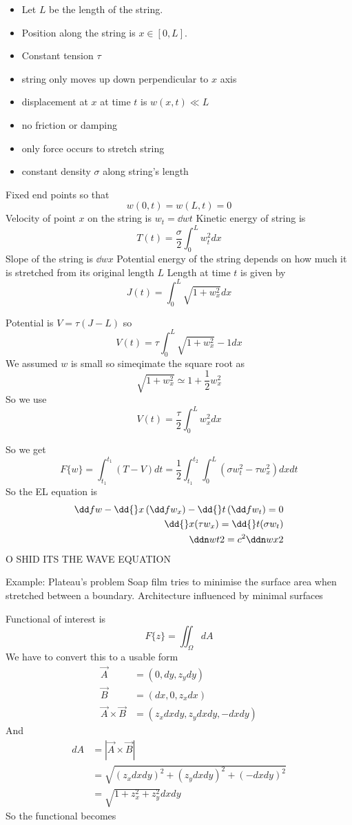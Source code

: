 \documentclass{E:/Documents/Latex/myassignment}
\begin{document}
\begin{itemize}
	\item Let $L$ be the length of the string.
	\item Position along the string is $x \in [0,L]$.
	\item Constant tension $\tau$
	\item string only moves up down perpendicular to $x$ axis
	\item displacement at $x$ at time $t$ is $w(x,t) \ll L$
	\item no friction or damping
	\item only force occurs to stretch string
	\item constant density $\sigma$ along string's length
\end{itemize}

Fixed end points so that
\[w(0,t) = w(L,t) = 0\]
Velocity of point $x$ on the string is $w_t = \dd wt$
Kinetic energy of string is
\[T(t) = \frac \sigma 2 \int_0^L w_t^2 dx\]
Slope of the string is $\dd wx$
Potential energy of the string depends on how much it is stretched from its original length $L$
Length at time $t$ is given by
\[J(t) = \int_0^L \sqrt{1 + w_x^2} dx\]

Potential is $V = \tau(J-L)$ so
\[V(t) = \tau \int_0^L \sqrt{1 + w_x^2} - 1 dx\]
We assumed $w$ is small so simeqimate the square root as
\[\sqrt{1+w_x^2} \simeq 1 + \frac12 w_x^2\]
So we use
\[V(t) = \frac{\tau}{2} \int_0^L w_x^2 dx\]


So we get
\[F\{w\} = \int_{t_1}^{t_1} \left(T-V\right) dt = \frac12 \int_{t_1}^{t_2} \int_0^L \left(\sigma w_t^2 - \tau w_x^2\right) dx dt\]
So the EL equation is
\begin{align*}
	\dd fw - \dd{}x\left(\dd f{w_x}\right) - \dd{}t \left(\dd f{w_t}\right) = 0\\
	\dd{}x (\tau w_x) = \dd{}t (\sigma w_t)\\
	\ddn wt2 = c^2 \ddn wx2
\end{align*}
O SHID ITS THE WAVE EQUATION






Example: Plateau's problem
Soap film tries to minimise the surface area when stretched between a boundary.
Architecture influenced by minimal surfaces

Functional of interest is
\[F\{z\} = \iint_{\Omega} dA\]
We have to convert this to a usable form
\begin{align*}
	\vec A &= (0,dy,z_ydy)\\
	\vec B &= (dx,0,z_x dx)\\
	\vec A\times \vec B &= (z_x dxdy, z_y dxdy, -dxdy)
\end{align*}
And
\begin{align*}
	dA &= |\vec A\times \vec B| \\
	&=	\sqrt{(z_xdxdy)^2 + (z_ydxdy)^2 + (-dxdy)^2}\\
	&= \sqrt{1+ z_x^2 + z_y^2} dxdy
\end{align*}
So the functional becomes
\end{document}
